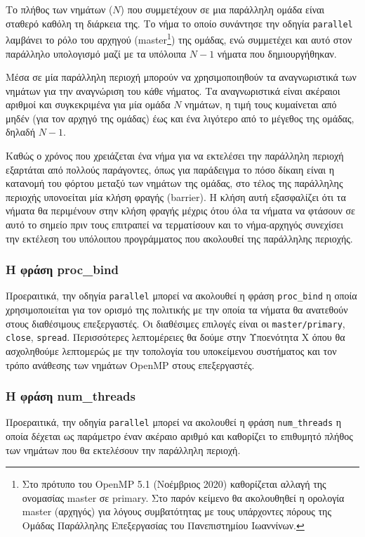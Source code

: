 Το πλήθος των νημάτων ($N$) που συμμετέχουν σε μια παράλληλη ομάδα είναι σταθερό καθόλη τη διάρκεια της. Το νήμα το οποίο συνάντησε την οδηγία \texttt{parallel} λαμβάνει το ρόλο του αρχηγού (master\footnote{Στο πρότυπο του OpenMP 5.1 (Νοέμβριος 2020) καθορίζεται αλλαγή της ονομασίας master σε primary. Στο παρόν κείμενο θα ακολουθηθεί η ορολογία master (αρχηγός) για λόγους συμβατότητας με τους υπάρχοντες πόρους της Ομάδας Παράλληλης Επεξεργασίας του Πανεπιστημίου Ιωαννίνων.}) της ομάδας, ενώ συμμετέχει και αυτό στον παράλληλο υπολογισμό μαζί με τα υπόλοιπα $N-1$ νήματα που δημιουργήθηκαν.

Μέσα σε μία παράλληλη περιοχή μπορούν να χρησιμοποιηθούν τα αναγνωριστικά των νημάτων για την αναγνώριση του κάθε νήματος. Τα αναγνωριστικά είναι ακέραιοι αριθμοί και συγκεκριμένα για μία ομάδα $N$ νημάτων, η τιμή τους κυμαίνεται από μηδέν (για τον αρχηγό της ομάδας) έως και ένα λιγότερο από το μέγεθος της ομάδας, δηλαδή $N-1$.

Καθώς ο χρόνος που χρειάζεται ένα νήμα για να εκτελέσει την παράλληλη περιοχή εξαρτάται από πολλούς παράγοντες, όπως για παράδειγμα το πόσο δίκαιη είναι η κατανομή του φόρτου μεταξύ των νημάτων της ομάδας, στο τέλος της παράλληλης περιοχής υπονοείται μία κλήση φραγής (barrier). Η κλήση αυτή εξασφαλίζει ότι τα νήματα θα περιμένουν στην κλήση φραγής μέχρις ότου όλα τα νήματα να φτάσουν σε αυτό το σημείο πριν τους επιτραπεί να τερματίσουν και το νήμα-αρχηγός συνεχίσει την εκτέλεση του υπόλοιπου προγράμματος που ακολουθεί της παράλληλης περιοχής.

\subsubsection{Η φράση proc\_bind}
Προεραιτικά, την οδηγία \texttt{parallel} μπορεί να ακολουθεί η φράση \texttt{proc\_bind} η οποία χρησιμοποιείται για τον ορισμό της πολιτικής με την οποία τα νήματα θα ανατεθούν στους διαθέσιμους επεξεργαστές. Οι διαθέσιμες επιλογές είναι οι \texttt{master/primary}, \texttt{close}, \texttt{spread}. Περισσότερες λεπτομέρειες θα δούμε στην Υποενότητα Χ όπου θα ασχοληθούμε λεπτομερώς με την τοπολογία του υποκείμενου συστήματος και τον τρόπο ανάθεσης των νημάτων OpenMP στους επεξεργαστές.

\subsubsection{Η φράση num\_threads}
Προεραιτικά, την οδηγία \texttt{parallel} μπορεί να ακολουθεί η φράση \texttt{num\_threads} η οποία δέχεται ως παράμετρο έναν ακέραιο αριθμό και καθορίζει το επιθυμητό πλήθος των νημάτων που θα εκτελέσουν την παράλληλη περιοχή.

